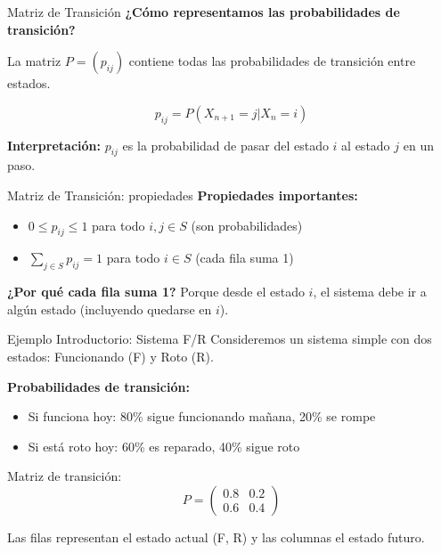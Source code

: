 \documentclass{beamer}
\begin{document}
\begin{frame}{Matriz de Transición}
    \small
    \textbf{¿Cómo representamos las probabilidades de transición?}

    \vspace{0.5em}

    La matriz $P = (p_{ij})$ contiene todas las probabilidades de transición entre estados.

    \[p_{ij} = P(X_{n+1} = j | X_n = i)\]

    \textbf{Interpretación:} $p_{ij}$ es la probabilidad de pasar del estado $i$ al estado $j$ en un paso.
\end{frame}

\begin{frame}{Matriz de Transición: propiedades}
    \small
    \textbf{Propiedades importantes:}
    \begin{itemize}
        \item $0 \leq p_{ij} \leq 1$ para todo $i,j \in S$ (son probabilidades)
        \item $\sum_{j \in S} p_{ij} = 1$ para todo $i \in S$ (cada fila suma 1)
    \end{itemize}

    \vspace{1em}

    \textbf{¿Por qué cada fila suma 1?} Porque desde el estado $i$, el sistema debe ir a algún estado (incluyendo quedarse en $i$).
\end{frame}

\begin{frame}{Ejemplo Introductorio: Sistema F/R}
    \small
    Consideremos un sistema simple con dos estados: Funcionando (F) y Roto (R).

    \vspace{0.5em}

    \textbf{Probabilidades de transición:}
    \begin{itemize}
        \item Si funciona hoy: 80\% sigue funcionando mañana, 20\% se rompe
        \item Si está roto hoy: 60\% es reparado, 40\% sigue roto
    \end{itemize}

    \vspace{0.5em}

    Matriz de transición:
    \[P = \begin{pmatrix}
    0.8 & 0.2 \\
    0.6 & 0.4
    \end{pmatrix}\]

    Las filas representan el estado actual (F, R) y las columnas el estado futuro.
\end{frame}
\end{document}

